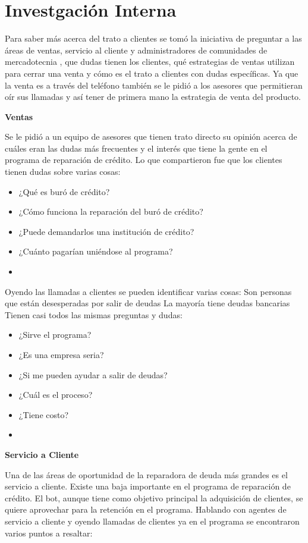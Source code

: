 \chapter{Investgación Interna}

Para saber más acerca del trato a clientes se tomó la iniciativa de preguntar a las áreas de ventas, servicio al cliente y administradores de comunidades de mercadotecnia , que dudas tienen los clientes, qué estrategias de ventas utilizan para cerrar una venta y cómo es el trato a clientes con dudas específicas.
Ya que la venta es a través del teléfono también se le pidió a los asesores que permitieran oír sus llamadas y así tener de primera mano la estrategia de venta del producto.

\textbf{Ventas}

Se le pidió a un equipo de asesores que tienen trato directo su opinión acerca de cuáles eran las dudas más frecuentes y el interés que tiene la gente en el programa de reparación de crédito. 
Lo que compartieron fue que los clientes tienen dudas sobre varias cosas:

\begin{itemize}
\item ¿Qué es buró de crédito?
\item ¿Cómo funciona la reparación del buró de crédito?
\item ¿Puede demandarlos una institución de crédito?
\item ¿Cuánto pagarían uniéndose al programa?
\item 
\end{itemize}

Oyendo las llamadas a clientes se pueden identificar varias cosas:
Son personas que están desesperadas por salir de deudas
La mayoría tiene deudas bancarias
Tienen casi todos las mismas preguntas y dudas:

\begin{itemize}
\item ¿Sirve el programa?
\item  ¿Es una empresa seria?
\item ¿Si me pueden ayudar a salir de deudas?
\item ¿Cuál es el proceso?
\item ¿Tiene costo?
\item 
\end{itemize}


\textbf{Servicio a Cliente}

Una de las áreas de oportunidad de la reparadora de deuda más grandes es el servicio a cliente. Existe una baja importante en el programa de reparación de crédito. El bot, aunque tiene como objetivo principal la adquisición de clientes, se quiere aprovechar para la retención en el programa.
Hablando con agentes de servicio a cliente y oyendo llamadas de clientes ya en el programa se encontraron varios puntos a resaltar:


